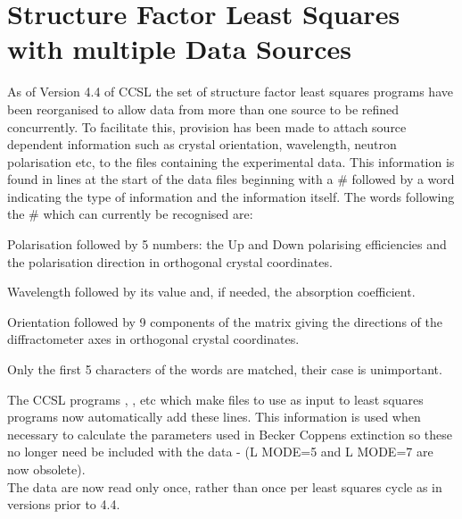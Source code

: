 \section{Structure Factor Least Squares with multiple Data Sources}
As of Version 4.4 of CCSL the set of structure factor least squares programs have been reorganised to allow
data from more than one source to be refined concurrently. To facilitate this,
provision has been made to attach source dependent information such as crystal orientation, wavelength, neutron polarisation etc, to the files containing the experimental data. This information is found in lines at the start of the data files  beginning with a \#  followed by a word indicating the type of information and the information itself. The words following the \# which can currently be recognised are: 
\begin{description}
\item{Polarisation} followed by 5 numbers: the Up and Down polarising efficiencies
		and the polarisation direction in orthogonal crystal coordinates.
\item{Wavelength} followed by  its value and, if needed, the absorption 
		coefficient.
\item{Orientation} followed by 9 components of the matrix giving the directions of the diffractometer axes in orthogonal crystal coordinates.
\end{description}
Only the first 5 characters of the words are matched, their case is unimportant.

The CCSL  programs , ,  etc which make 
files  to use as input to least
squares programs now automatically add these lines.
This information is used when necessary to calculate the parameters used in
Becker Coppens extinction so these no longer need be included with the data -
(L MODE=5 and L MODE=7 are now obsolete).\\
The data are now read only once, rather than once per least squares cycle as
in versions prior to 4.4.

